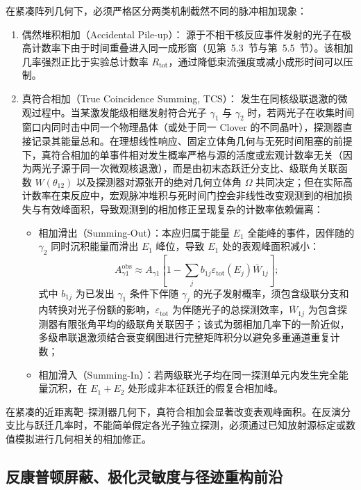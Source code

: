在紧凑阵列几何下，必须严格区分两类机制截然不同的脉冲相加现象：
\begin{enumerate}
\item 偶然堆积相加（Accidental Pile-up）：
源于不相干核反应事件发射的光子在极高计数率下由于时间重叠进入同一成形窗（见第~5.3~节与第~5.5~节）。该相加几率强烈正比于实验总计数率 $R_{\mathrm{tot}}$，通过降低束流强度或减小成形时间可以压制。
\item 真符合相加（True Coincidence Summing, TCS）：
发生在同核级联退激的微观过程中。当某激发能级相继发射符合光子 $\gamma_1$ 与 $\gamma_2$ 时，若两光子在收集时间窗口内同时击中同一个物理晶体（或处于同一 Clover 的不同晶叶），探测器直接记录其能量总和。在理想线性响应、固定立体角几何与无死时间阻塞的前提下，真符合相加的单事件相对发生概率严格与源的活度或宏观计数率无关（因为两光子源于同一次微观核退激），而是由初末态跃迁分支比、级联角关联函数 $W(\theta_{12})$ 以及探测器对源张开的绝对几何立体角 $\Omega$ 共同决定；但在实际高计数率在束反应中，宏观脉冲堆积与死时间门控会非线性改变观测到的相加损失与有效峰面积，导致观测到的相加修正呈现复杂的计数率依赖偏离：
\begin{itemize}
\item 相加滑出（Summing-Out）：本应归属于能量 $E_1$ 全能峰的事件，因伴随的 $\gamma_2$ 同时沉积能量而滑出 $E_1$ 峰位，导致 $E_1$ 处的表观峰面积减小：
\begin{equation}\label{eq:5-2-summing-out}
A_{\gamma 1}^{\mathrm{obs}} \approx A_{\gamma 1} \left[ 1 - \sum_j b_{1j} \varepsilon_{\mathrm{tot}}(E_j) \bar{W}_{1j} \right];
\end{equation}
式中 $b_{1j}$ 为已发出 $\gamma_1$ 条件下伴随 $\gamma_j$ 的光子发射概率，须包含级联分支和内转换对光子份额的影响，$\varepsilon_{\mathrm{tot}}$ 为伴随光子的总探测效率，$\bar{W}_{1j}$ 为包含探测器有限张角平均的级联角关联因子；该式为弱相加几率下的一阶近似，多级串联退激须结合衰变纲图进行完整矩阵积分以避免多重通道重复计数；
\item 相加滑入（Summing-In）：若两级联光子均在同一探测单元内发生完全能量沉积，在 $E_1 + E_2$ 处形成非本征跃迁的假复合相加峰。
\end{itemize}
\end{enumerate}
在紧凑的近距离靶--探测器几何下，真符合相加会显著改变表观峰面积。在反演分支比与跃迁几率时，不能简单假定各光子独立探测，必须通过已知放射源标定或数值模拟进行几何相关的相加修正。

\subsection{反康普顿屏蔽、极化灵敏度与径迹重构前沿}\label{subsec:5-2-5}

